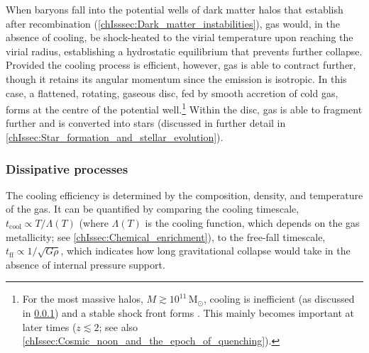 When baryons fall into the potential wells of dark matter halos that establish after recombination (\cref{chIsssec:Dark_matter_instabilities}), gas would, in the absence of cooling, be shock-heated to the virial temperature upon reaching the virial radius, establishing a hydrostatic equilibrium that prevents further collapse. Provided the cooling process is efficient, however, gas is able to contract further, though it retains its angular momentum since the emission is isotropic. In this case, a flattened, rotating, gaseous disc, fed by smooth accretion of cold gas, forms at the centre of the potential well.\footnote{For the most massive halos, $M \gtrsim 10^{11} \, \mathrm{M_\odot}$, cooling is inefficient (as discussed in \cref{chIsssec:Dissipative_processes}) and a stable shock front forms \citep[``hot-mode'' accretion;][]{2003MNRAS.345..349B}. This mainly becomes important at later times ($z \lesssim 2$; see also \cref{chIssec:Cosmic_noon_and_the_epoch_of_quenching}).} Within the disc, gas is able to fragment further and is converted into stars (discussed in further detail in \cref{chIssec:Star_formation_and_stellar_evolution}).

\subsubsection{Dissipative processes}
\label{chIsssec:Dissipative_processes}

The cooling efficiency is determined by the composition, density, and temperature of the gas. It can be quantified by comparing the cooling timescale, $t_\text{cool} \propto T/\Lambda(T)$ (where $\Lambda(T)$ is the cooling function, which depends on the gas metallicity; see \cref{chIssec:Chemical_enrichment}), to the free-fall timescale, $t_\text{ff} \propto 1/\sqrt{G\rho}$, which indicates how long gravitational collapse would take in the absence of internal pressure support.

